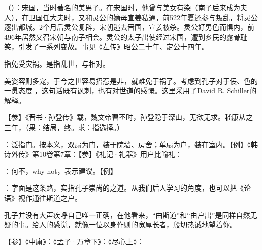 {
\begin{lyitemize}
\item {}（）：宋国，当时著名的美男子。在宋国时，他曾与美女有染（南子后来成为夫人），在卫国任大夫时，又和灵公的嫡母宣姜私通，前522年夏还参与叛乱，将灵公逐出都城。2个月后灵公复辟，宋朝逃去晋国，宣姜被杀。灵公好男色而惧内，前496年居然又召宋朝与南子相会。灵公的太子出使经过宋国，遭到乡民的露骨耻笑，引发了一系列变故。事见《左传》昭公二十年、定公十四年。
\item {}指免受灾祸。是指乱世，与相对。

美姿容则多宠，于今之世容易招惹是非，就难免于祸了。考虑到孔子对于佞、色的一贯态度  ，这句话既有讽刺，也有对世道的感慨。这里采用了David R. Schiller的解释。
\end{lyitemize}
【参】《晋书·孙登传》载，魏文帝曹丕时，孙登隐于深山，无欲无求。嵇康从之三年，（果：结局，终。求：指选择。）
}
{}


{
\item {}：泛指门。按本义，双扇为门，装于院墙、房舍；单扇为户，装在室内。【例】《韩诗外传》第10卷第7章：【参】《礼记·礼器》用户比喻礼：

\item {}：何不，why not，表示建议。【例】 

\item {}：字面是这条路，实指孔子崇尚的之道。从我们后人学习的角度，也可以把《论语》视作通往斯道之户。

孔子并没有大声疾呼自己唯一正确，在他看来，“由斯道”和“由户出”是同样自然无疑的事。给人的感觉，就像一位以身作则的宽厚长者，殷切热诚地望着你。

【参】《中庸》：《孟子·万章下》：《尽心上》：
}
{}


